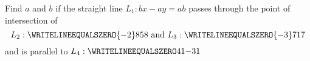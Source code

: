 



\FRACMINUS\vd\ve\va\vb\tp\tq
\FRACMINUS\vf\ve\vc\vb\tr\ts
\FRACDIV\tr\ts\tp\tq\ixn\ixd %
\FRACL{-\va}{\vc}\ixn\ixd\iyn\iyd
\FRACDIV\iyn\iyd{}\iyn\iyd
\MULTIPLY\ixn\iyd\tp
\MULTIPLY{\ixd}\iyn\tq
\MULTIPLY\ixd\iyd\tr
\MULTIPLY\vg\tp\ga
\MULTIPLY\tr\vg\gb
\SUBTRACT\ga\tq\aq
\FRACMULT{}\aq\gb\bq\cq

\question[2] Find $a$ and $b$ if the straight line $L_1: bx - ay = ab$ passes through the point of intersection of 
\[ L_2: \WRITELINEEQUALSZERO{-\va}\vb\vc\vb\text{ and } L_3: \WRITELINEEQUALSZERO{-\vd}\ve\vf\ve\] 
and is parallel to $L_4: \WRITELINEEQUALSZERO\vg{1}{-\vh}{1}$

\watchout

